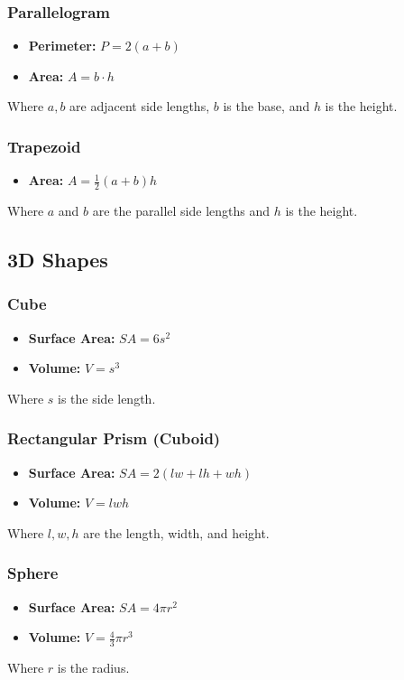 \subsubsection{Parallelogram}
\begin{itemize}
    \item \textbf{Perimeter:} $P = 2(a+b)$
    \item \textbf{Area:} $A = b \cdot h$
\end{itemize}
Where $a, b$ are adjacent side lengths, $b$ is the base, and $h$ is the height.

\subsubsection{Trapezoid}
\begin{itemize}
    \item \textbf{Area:} $A = \frac{1}{2}(a+b)h$
\end{itemize}
Where $a$ and $b$ are the parallel side lengths and $h$ is the height.


\subsection{3D Shapes}

\subsubsection{Cube}
\begin{itemize}
    \item \textbf{Surface Area:} $SA = 6s^2$
    \item \textbf{Volume:} $V = s^3$
\end{itemize}
Where $s$ is the side length.

\subsubsection{Rectangular Prism (Cuboid)}
\begin{itemize}
    \item \textbf{Surface Area:} $SA = 2(lw + lh + wh)$
    \item \textbf{Volume:} $V = lwh$
\end{itemize}
Where $l, w, h$ are the length, width, and height.

\subsubsection{Sphere}
\begin{itemize}
    \item \textbf{Surface Area:} $SA = 4\pi r^2$
    \item \textbf{Volume:} $V = \frac{4}{3}\pi r^3$
\end{itemize}
Where $r$ is the radius.

